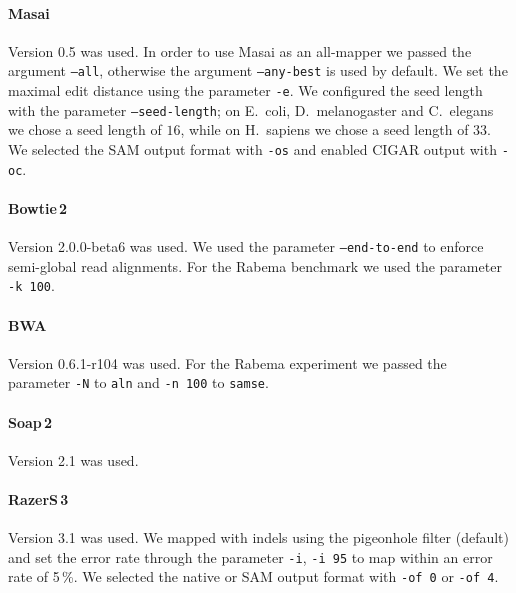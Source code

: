 \paragraph{Masai}
Version 0.5 was used.
In order to use Masai as an all-mapper we passed the argument \texttt{--all}, otherwise the argument \texttt{--any-best} is used by default.
We set the maximal edit distance using the parameter \texttt{-e}.
We configured the seed length with the parameter \texttt{--seed-length}; on E.~coli, D.~melanogaster and C.~elegans we chose a seed length of $16$, while on H.~sapiens we chose a seed length of $33$.
We selected the SAM output format with \texttt{-os} and enabled CIGAR output with \texttt{-oc}.

\paragraph{Bowtie\,2}
Version 2.0.0-beta6 was used.
We used the parameter \texttt{--end-to-end} to enforce semi-global read alignments.
For the Rabema benchmark we used the parameter \texttt{-k 100}.

\paragraph{BWA}
Version 0.6.1-r104 was used.
For the Rabema experiment we passed the parameter \texttt{-N} to \texttt{aln} and \texttt{-n 100} to \texttt{samse}.

\paragraph{Soap\,2}
Version 2.1 was used.

\paragraph{RazerS\,3}
Version 3.1 was used.
We mapped with indels using the pigeonhole filter (default) and set the error rate through the parameter \texttt{-i}, \eg \texttt{-i 95} to map within an error rate of 5\,\%.
We selected the native or SAM output format with \texttt{-of 0} or \texttt{-of 4}.

